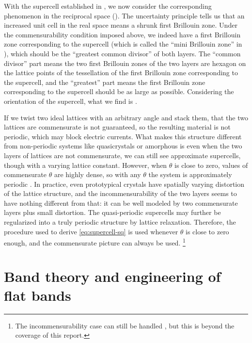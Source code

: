 \documentclass[hyperref, a4paper]{article}
\begin{document}
With the supercell established in ,
we now consider the corresponding phenomenon in the reciprocal space
().
The uncertainty principle tells us that an increased unit cell in the real space 
means a shrunk first Brillouin zone.
Under the commensurability condition imposed above,
we indeed have a first Brillouin zone corresponding to the supercell
(which is called the ``mini Brillouin zone'' in \cite{cao_correlated_2018,cao_unconventional_2018}),
which should be the ``greatest common divisor'' of both layers.
The ``common divisor'' part means the two first Brillouin zones of the two layers 
are hexagon on the lattice points of the tessellation 
of the first Brillouin zone corresponding to the supercell,
and the ``greatest'' part means the first Brillouin zone corresponding to the supercell
should be as large as possible.
Considering the orientation of the supercell,
what we find is .

If we twist two ideal lattices with an arbitrary angle and stack them,
that the two lattices are commensurate is not guaranteed,
so the resulting material is not periodic,
which may block electric currents.
What makes this structure different from non-periodic systems like quasicrystals or amorphous is 
even when the two layers of lattices are not commensurate,
we can still see approximate supercells,
though with a varying lattice constant.
However, when $\theta$ is close to zero,
values of commensurate $\theta$ are highly dense,
so with any $\theta$ the system is approximately periodic \cite{yao_quasicrystalline_2018}.
In practice, even prototypical crystals have spatially varying distortion of the lattice structure,
and the incommensurability of the two layers seems to have nothing different from that:
it can be well modeled by two commensurate layers plus small distortion.
The quasi-periodic supercells may further be regularized into a truly periodic structure by lattice relaxation.
Therefore, the procedure used to derive \eqref{eq:supercell-sq} is used
whenever $\theta$ is close to zero enough,
and the commensurate picture can always be used.%
\footnote{
    The incommensurability case can still be handled \cite{catarina_twisted_2019},  
    but this is beyond the coverage of this report.
}

\section{Band theory and engineering of flat bands}
\end{document}
